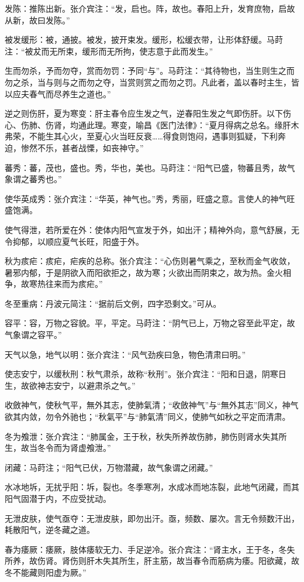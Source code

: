 \documentclass[draft,12pt]{ctexbook}
\begin{document}
\begin{jiaozhu}
	\item 发陈：推陈出新。张介宾注：“发，启也。阵，故也。春阳上升，发育庶物，启故从新，故曰发陈。”
	\item 被发缓形：被，通披。被发，披开束发。缓形，松缓衣带，让形体舒缓。马莳注：“被犮而无所束，缓形而无所拘，使志意于此而发生。”
	\item 生而勿杀，予而勿夺，赏而勿罚：予同“与”。马莳注：“其待物也，当生则生之而勿之杀，当与则与之而勿之夺，当赏则赏之而勿之罚。凡此者，盖以春时主生，皆以应夫春气而尽养生之道也。”
	\item 逆之则伤肝，夏为寒变：肝主春令应生发之气，逆春阳生发之气即伤肝。以下伤心、伤肺、伤肾，均通此理。寒变，喻昌《医门法律》：“夏月得病之总名。缘肝木弗荣，不能生其心火，至夏心火当旺反衰……得食则饱闷，遇事则狐疑，下利奔迫，惨然不乐，甚者战慄，如丧神守。”
	\item 蕃秀：蕃，茂也，盛也。秀，华也，美也。马莳注：“阳气已盛，物蕃且秀，故气象谓之蕃秀也。”
	\item 使华英成秀：张介宾注：“华英，神气也。”秀，秀丽，旺盛之意。言使人的神气旺盛饱满。
	\item 使气得泄，若所爱在外：使体内阳气宣发于外，如出汗；精神外向，意气舒展，无令抑郁，以顺应夏气长旺，阳盛于外。
	\item 秋为痎疟：痎疟，疟疾的总称。张介宾注：“心伤则暑气乘之，至秋而金气收敛，暑邪内郁，于是阴欲入而阳欲拒之，故为寒；火欲出而阴束之，故为热。金火相争，故寒热往来而为痎疟。”
	\item 冬至重病：丹波元简注：“据前后文例，四字恐剩文。”可从。
	\item 容平：容，万物之容貌。平，平定。马莳注：“阴气已上，万物之容至此平定，故气象谓之容平。”
	\item 天气以急，地气以明：张介宾注：“风气劲疾曰急，物色清肃曰明。”
	\item 使志安宁，以缓秋刑：秋气肃杀，故称“秋刑”。张介宾注：“阳和日退，阴寒日生，故欲神志安宁，以避肃杀之气。”
	\item 收斂神气，使秋气平，無外其志，使肺氣清；“收斂神气”与“無外其志”同义，神气欲其内敛，勿令外驰也；“秋氣平”与“肺氣清”同义，使肺气如秋之平定而清肃。
	\item 冬为飧泄：张介宾注：“肺属金，王于秋，秋失所养故伤肺，肺伤则肾水失其所生，故当冬令而为肾虚飧泄。”
	\item 闭藏：马莳注；“阳气已伏，万物潜藏，故气象谓之闭藏。”
	\item 水冰地坼，无扰乎阳：坼，裂也。冬季寒冽，水成冰而地冻裂，此地气闭藏，而其阳气固潜于内，不应受扰动。
	\item 无泄皮肤，使气亟夺：无泄皮肤，即勿出汗。亟，频数、屡次。言无令频数汗出，耗散阳气，逆冬藏之道。
	\item 春为痿厥：痿厥，肢体痿软无力、手足逆冷。张介宾注：“肾主水，王于冬，冬失所养，故伤肾。肾伤则肝木失其所生，肝主筋，故当春令而筋病为痿。阳欲藏，故冬不能藏则阳虚为厥。”
\end{jiaozhu}
\end{document}
